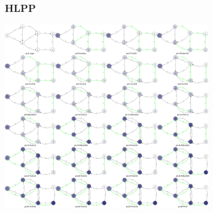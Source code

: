 \documentclass[UTF8, a4paper, titlepage, twoside]{ctexart}
\begin{document}
\subsubsection*{ HLPP }
\begin{center}
    \includegraphics[width=9cm]{graphs/hhlp.png}
\end{center}
\end{document}
